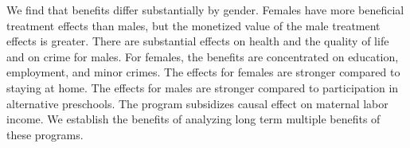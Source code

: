 We find that benefits differ substantially by gender. Females have more beneficial treatment effects than males, but the monetized value of the male treatment effects is greater. There are substantial effects on health and the quality of life and on crime for males. For females, the benefits are concentrated on education, employment, and minor crimes. The effects for females are stronger compared to staying at home. The effects for males are stronger compared to participation in alternative preschools. The program subsidizes causal effect on maternal labor income. We establish the benefits of analyzing long term multiple benefits of these programs.

\singlespace



 